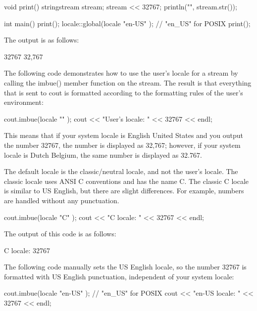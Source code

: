 \begin{cpp}
void print()
{
    stringstream stream;
    stream << 32767;
    println("{}", stream.str());
}

int main()
{
    print();
    locale::global(locale { "en-US" }); // "en_US" for POSIX
    print();
}
\end{cpp}

The output is as follows:

\begin{shell}
32767
32,767
\end{shell}


The following code demonstrates how to use the user’s locale for a stream by calling the imbue() member function on the stream. The result is that everything that is sent to cout is formatted according to the formatting rules of the user’s environment:

\begin{cpp}
cout.imbue(locale { "" });
cout << "User's locale: " << 32767 << endl;
\end{cpp}

This means that if your system locale is English United States and you output the number 32767, the number is displayed as 32,767; however, if your system locale is Dutch Belgium, the same number is displayed as 32.767.

The default locale is the classic/neutral locale, and not the user’s locale. The classic locale uses ANSI C conventions and has the name C. The classic C locale is similar to US English, but there are slight differences. For example, numbers are handled without any punctuation.

\begin{cpp}
cout.imbue(locale { "C" });
cout << "C locale: " << 32767 << endl;
\end{cpp}

The output of this code is as follows:

\begin{shell}
C locale: 32767
\end{shell}

The following code manually sets the US English locale, so the number 32767 is formatted with US English punctuation, independent of your system locale:

\begin{cpp}
cout.imbue(locale { "en-US" }); // "en_US" for POSIX
cout << "en-US locale: " << 32767 << endl;
\end{cpp}

